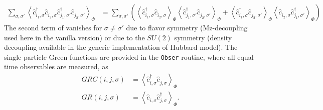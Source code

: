 \documentclass[10pt,modern]{scrartcl}
\numberwithin{exerciseitem}{exercise} %
\begin{document}
\begin{align}
\sum_{\sigma,\sigma'}\left\langle \hat{c}^\dagger_{i_1,\sigma}\hat{c}^{\phantom\dagger}_{i_2,\sigma} \hat{c}^\dagger_{j_1,\sigma'}\hat{c}^{\phantom\dagger}_{j_2,\sigma'} \right\rangle_\Phi & = 
\sum_{\sigma,\sigma'}\left(\left\langle \hat{c}^\dagger_{i_1,\sigma}\hat{c}^{\phantom\dagger}_{i_2,\sigma}\right\rangle_\Phi
\left\langle\hat{c}^\dagger_{j_1,\sigma'}\hat{c}^{\phantom\dagger}_{j_2,\sigma'} \right\rangle_\Phi
+\left\langle \hat{c}^\dagger_{i_1,\sigma}\hat{c}^{\phantom\dagger}_{j_2,\sigma'}\right\rangle_\Phi
\left\langle\hat{c}^{\phantom\dagger}_{i_2,\sigma}\hat{c}^\dagger_{j_1,\sigma'} \right\rangle_\Phi
\right)%
\end{align}
The second term of vanishes for $\sigma\neq\sigma'$ due to flavor symmetry (Mz-decoupling used here in the vanilla version) or due to the $SU(2)$ symmetry (density decoupling available in the generic implementation of Hubbard model). The single-particle Green functions are provided in the \texttt{Obser} routine, where all equal-time observables are measured, as
\begin{align}
GRC(i,j,\sigma) & = \left\langle \hat{c}^\dagger_{i,\sigma}\hat{c}^{\phantom\dagger}_{j,\sigma}\right\rangle_\Phi\\
GR(i,j,\sigma) & = \left\langle \hat{c}^{\phantom\dagger}_{i,\sigma}\hat{c}^\dagger_{j,\sigma}\right\rangle_\Phi .
\end{align}

\end{document}
